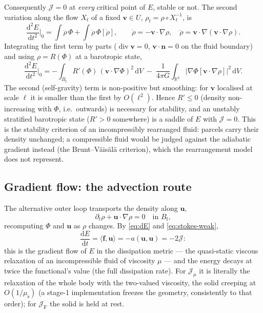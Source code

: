 \documentclass[11pt]{article}
\newcommand{\R}{\mathbb{R}}
\newcommand{\Jf}{\mathscr{J}}  %
\newcommand{\Bf}{B_{\mathrm{f}}}
\newcommand{\bu}{\mathbf{u}}
\newcommand{\bv}{\mathbf{v}}
\newcommand{\bn}{\mathbf{n}}
\newcommand{\bff}{\mathbf{f}}
\newcommand{\dV}{\,\mathrm{d}V}
\renewcommand{\div}{\operatorname{div}}
\newcommand{\ip}[2]{\langle #1, #2\rangle}
\newcommand{\JF}{\Jf _{\mathrm{F}}}
\newcommand{\Jmu}{\Jf _{\mu}}
\begin{document}
Consequently $\Jf  = 0$ at \emph{every} critical point of $E$, stable or
not. The second variation along the flow $X_t$ of a fixed $\bv\in U$,
$\rho_t = \rho\circ X_t^{-1}$, is
\begin{equation}
  \frac{\mathrm{d}^2E}{\mathrm{d}t^2}\Big|_{0}
  = \int\ddot\rho\,\Phi + \int\dot\rho\,\Phi[\dot\rho],
  \qquad \dot\rho = -\bv\cdot\nabla\rho, \quad
  \ddot\rho = \bv\cdot\nabla(\bv\cdot\nabla\rho).
\end{equation}
Integrating the first term by parts ($\div\bv = 0$, $\bv\cdot\bn = 0$ on
the fluid boundary) and using $\rho = R(\Phi)$ at a barotropic state,
\begin{equation}
  \frac{\mathrm{d}^2E}{\mathrm{d}t^2}\Big|_{0}
  = -\int_{\Bf} R'(\Phi)\,(\bv\cdot\nabla\Phi)^2\dV
    \;-\; \frac{1}{4\pi G}\int_{\R^3}\bigl|\nabla\Phi[\bv\cdot\nabla\rho]\bigr|^2\dV .
\end{equation}
The second (self-gravity) term is non-positive but smoothing: for $\bv$
localised at scale $\ell$ it is smaller than the first by $O(\ell^2)$.
Hence $R' \le 0$ (density non-increasing with $\Phi$, i.e.\ outwards) is
necessary for stability, and an unstably stratified barotropic state
($R' > 0$ somewhere) is a saddle of $E$ with $\Jf  = 0$. This is the
stability criterion of an incompressibly rearranged fluid: parcels
carry their density unchanged; a compressible fluid would be judged
against the adiabatic gradient instead (the Brunt--V\"ais\"al\"a
criterion), which the rearrangement model does not represent.

\subsection{Gradient flow: the advection route}

The alternative outer loop transports the density along $\bu$,
\begin{equation}
  \partial_t\rho + \bu\cdot\nabla\rho = 0 \quad\text{in } \Bf ,
  \label{eq:advection}
\end{equation}
recomputing $\Phi$ and $\bu$ as $\rho$ changes. By \eqref{eq:dE} and
\eqref{eq:stokes-weak},
\begin{equation}
  \frac{\mathrm{d}E}{\mathrm{d}t} = \ip{\bff}{\bu} = -a(\bu,\bu) = -2\Jf  :
\end{equation}
this is the gradient flow of $E$ in the dissipation metric --- the
quasi-static viscous relaxation of an incompressible fluid of viscosity
$\mu$ --- and the energy decays at twice the functional's value (the
full dissipation rate). For $\Jmu$ it is literally the relaxation of the
whole body with the two-valued viscosity, the solid creeping at
$O(1/\mu_{\mathrm{s}})$ (a stage-1 implementation freezes the geometry,
consistently to that order); for $\JF$ the solid is held at rest.
\end{document}
